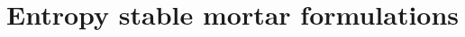 \documentclass{svjour3}                     %
\begin{document}
%

%

\section{Entropy stable mortar formulations}
\label{sec:3}
\end{document}

